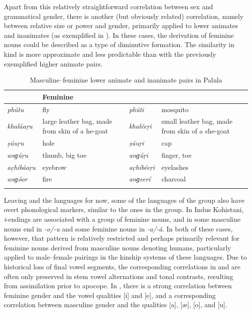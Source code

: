 \documentclass[output=collectionpaper]{langsci/langscibook}
\begin{document}
Apart from this relatively straightforward correlation between sex and grammatical gender, there is another (but obviously related) correlation, namely between relative size or power and gender, primarily applied to lower animates and inanimates (as exemplified in ). In these cases, the derivation of feminine nouns could be described as a type of diminutive formation. The similarity in kind is more approximate and less predictable than with the previously exemplified higher animate pairs.

\begin{table}[htb]
\begin{tabularx}{\textwidth}{>{\itshape}lX>{\itshape}lX}
\lsptoprule

\multicolumn{2}{X}{\normalfont Masculine} & \multicolumn{2}{X}{\normalfont Feminine}\\
\midrule
phútu & fly & phúti & mosquito\\
khaláaṛu & large leather bag, made from skin of a he-goat & khaléeṛi & small leather bag, made from skin of a she-goat\\
ṣúuṛu & hole & ṣúuṛi & cap\\
anɡúṛu & thumb, big toe & anɡúṛi & finger, toe\\
ac̣hibáaṛu & eyebrow & ac̣hibéeṛi & eyelashes\\
anɡóor & fire & anɡeerí & charcoal\\
\lspbottomrule
\end{tabularx}
\caption{Masculine--feminine lower animate and inanimate pairs in Palula}
\label{tab:Lilje:10}
\end{table}


Leaving  and the  languages for now, some of the languages of the  group also have overt phonological markers, similar to the ones in the  group. In Indus Kohistani, \textit{i}{}-endings are associated with a group of feminine nouns, and in  some masculine nouns end in \textit{\nobreakdash-o/-u} and some feminine nouns in \textit{\nobreakdash-\-a/-ã}. In both of these cases, however, that pattern is relatively restricted and perhaps primarily relevant for feminine nouns derived from masculine nouns denoting humans, particularly applied to male--female pairings in the kinship systems of these languages. Due to historical loss of final vowel segments, the corresponding correlations in  and  are often only preserved in stem vowel alternations and tonal contrasts, resulting from assimilation prior to apocope. In , there is a strong correlation between feminine gender and the vowel qualities [i] and [e], and a corresponding correlation between masculine gender and the qualities [a], [æ], [o], and [u].
\end{document}

